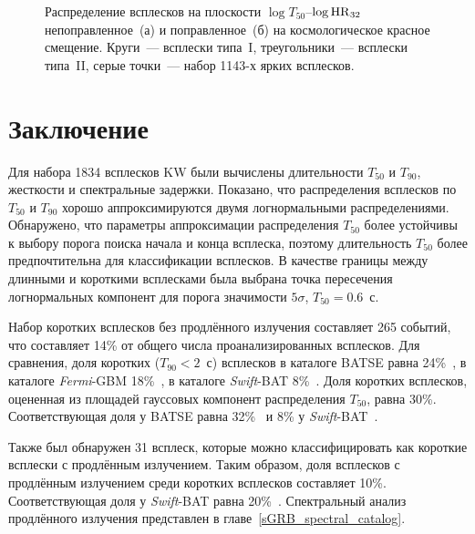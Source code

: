 \begin{figure}[h]
  \begin{minipage}[h]{0.5\textwidth}
  \end{minipage}
  \hfill
  \begin{minipage}[h]{0.5\textwidth}
  \end{minipage}
  \caption{Распределение всплесков на плоскости $\log T_{50}$--$\log {\mathrm{HR}}_{32}$ 
  непоправленное~(а) и поправленное~(б) на космологическое красное смещение. 
  Круги~--- всплески типа~I, треугольники~--- всплески типа~II, 
  серые точки~--- набор 1143-х ярких всплесков.
  }
  \label{img:T50HRzCorr}  
\end{figure}

\section{Заключение} \label{sec:Conclision}
Для набора 1834 всплесков KW были вычислены длительности $T_{50}$ и $T_{90}$, жесткости 
и спектральные задержки. Показано, что распределения 
всплесков по $T_{50}$ и $T_{90}$ хорошо аппроксимируются двумя логнормальными 
распределениями. Обнаружено, что параметры аппроксимации распределения $T_{50}$ 
более устойчивы к выбору порога поиска начала и конца всплеска, поэтому длительность 
$T_{50}$ более предпочтительна для классификации всплесков. В качестве границы между 
длинными и короткими всплесками была выбрана точка пересечения логнормальных компонент 
для порога значимости $5\sigma$, $T_{50} = 0.6$~с. 

Набор коротких всплесков без продлённого излучения составляет 265 событий, 
что составляет 14\% от общего числа проанализированных всплесков. Для сравнения, 
доля коротких ($T_{90}<2$~с) всплесков в каталоге BATSE равна 24\%~\citep{Meegan_2001}, %
в каталоге \textit{Fermi}-GBM 18\%~\citep{Paciesas_2012}, 
в каталоге \textit{Swift}-BAT 8\%~\citep{Sakamoto_2011ApJS}. 
Доля коротких всплесков, оцененная из площадей гауссовых компонент 
распределения $T_{50}$, равна 30\%. Соответствующая доля у BATSE равна 32\%~\citep{Horvath_2002} 
и 8\% у \textit{Swift}-BAT~\citep{Horvath_2008}.  

Также был обнаружен 31 всплеск, которые можно классифицировать как короткие 
всплески с продлённым излучением. Таким образом, доля всплесков с продлённым 
излучением среди коротких всплесков составляет 10\%. Соответствующая доля 
у \textit{Swift}-BAT равна 20\%~\citep{Sakamoto_2011ApJS}. 
Спектральный анализ продлённого излучения представлен в главе~\ref{sGRB_spectral_catalog}.

